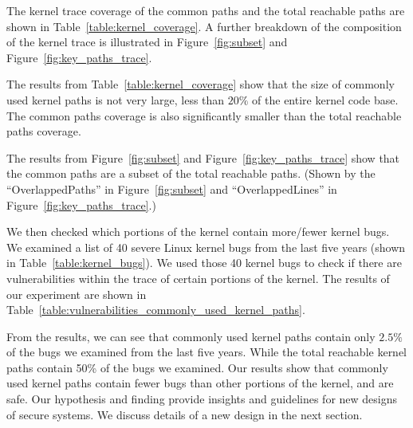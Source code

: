 The kernel trace coverage of the common paths and the total reachable paths are shown in Table~\ref{table:kernel_coverage}. 
A further breakdown of the composition of the kernel trace is illustrated in Figure~\ref{fig:subset} and Figure~\ref{fig:key_paths_trace}.

The results from Table~\ref{table:kernel_coverage} show that the size of commonly used kernel paths is not very large, less than $20\%$ 
of the entire kernel code base. The common paths coverage is also significantly smaller than the total reachable paths coverage. 

The results from Figure~\ref{fig:subset} and Figure~\ref{fig:key_paths_trace} show that the common paths are a subset of the total reachable paths. 
(Shown by the ``OverlappedPaths'' in Figure~\ref{fig:subset} and ``OverlappedLines'' in Figure~\ref{fig:key_paths_trace}.) 

We then checked which portions of the kernel contain more/fewer kernel bugs. 
We examined a list of 40 severe Linux kernel bugs from the last five years (shown in Table~\ref{table:kernel_bugs}). 
We used those 40 kernel bugs to check if there are vulnerabilities within the trace of certain portions of the kernel.
The results of our experiment are shown in Table~\ref{table:vulnerabilities_commonly_used_kernel_paths}.  

From the results, we can see that commonly used kernel paths contain only $2.5\%$ of the bugs we examined 
from the last five years. While the total reachable kernel paths contain 50\% of the bugs we examined. 
Our results show that commonly used kernel paths
contain fewer bugs than other portions of the kernel, and are safe. 
Our hypothesis and finding provide insights and guidelines for new designs of secure systems. We discuss details of 
a new design in the next section. 

